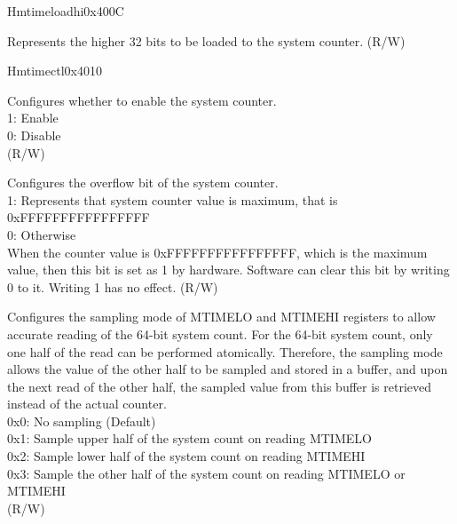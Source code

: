 \begin{register}{H}{mtimeloadhi}{0x400C}\label{regdesc:CLINTMTIMELOADHIREG}
%
\regnewline%
\begin{regdesc}
\begin{reglist}
\label{fielddesc:CLINTMTIMELOADHI}\item [MTIME\_LOADHI] Represents the higher 32 bits to be loaded to the system counter. (R/W)
\end{reglist}
\end{regdesc}
\end{register}

\begin{register}{H}{mtimectl}{0x4010}\label{regdesc:CLINTMTIMECTLREG}
%
%
%
%
\regnewline%
\begin{regdesc}
\begin{reglist}
\label{fielddesc:CLINTMTIMECTLEN}\item [MTIME\_EN] Configures whether to enable the system counter. \\
1: Enable\\
0: Disable\\
(R/W)
\label{fielddesc:CLINTMTIMECTLOVF}\item [MTIME\_OVF] Configures the overflow bit of the system counter. \\
1: Represents that system counter value is maximum, that is 0xFFFFFFFFFFFFFFFF\\
0: Otherwise\\
When the counter value is 0xFFFFFFFFFFFFFFFF, which is the maximum value, then this bit is set as 1 by hardware. Software can clear this bit by writing 0 to it. Writing 1 has no effect.
(R/W)
\label{fielddesc:CLINTMTIMECTLSAM}\item [MTIME\_SAM] Configures the sampling mode of MTIMELO and MTIMEHI registers to allow accurate reading of the 64-bit system count. For the 64-bit system count, only one half of the read can be performed atomically. Therefore, the sampling mode allows the value of the other half to be sampled and stored in a buffer, and upon the next read of the other half, the sampled value from this buffer is retrieved instead of the actual counter. \\
0x0: No sampling (Default)\\
0x1: Sample upper half of the system count on reading MTIMELO\\
0x2: Sample lower half of the system count on reading MTIMEHI\\
0x3: Sample the other half of the system count on reading MTIMELO or MTIMEHI\\
(R/W)
\end{reglist}
\end{regdesc}
\end{register}

